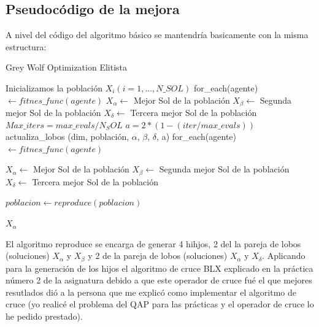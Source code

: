 \documentclass[a4paper, 12.5pt]{report}
\begin{document}
\subsection{Pseudocódigo de la mejora}

A nivel del código del algoritmo básico se mantendría basicamente con la misma estructura:

\begin{algorithm}[H]
    \caption{Grey Wolf Optimization Elitista}\label{alg:GWO_mejorado}
    \begin{algorithmic}[1]
        \State Inicializamos la población $X_i (i=1,...,N\_SOL)$
        \State for\_each(agente) $ \gets fitnes\_func(agente)$
        \State $X_\alpha \gets$ Mejor Sol de la población
        \State $X_\beta \gets$ Segunda mejor Sol de la población
        \State $X_\delta \gets$ Tercera mejor Sol de la población
        \State $Max\_iters=max\_evals/N_SOL$
        \State $a=2*(1-(iter/max\_evals))$
        \State actualiza\_lobos (dim, población, $\alpha$, $\beta$, $\delta$, a)
        \State for\_each(agente) $ \gets fitnes\_func(agente)$

        \State $X_\alpha \gets$ Mejor Sol de la población
        \State $X_\beta \gets$ Segunda mejor Sol de la población
        \State $X_\delta \gets$ Tercera mejor Sol de la población

        \State $poblacion \gets reproduce(poblacion)$ 


        \EndFor

        \Return $X_\alpha $
        \EndFunction


    \end{algorithmic}
\end{algorithm}


El algoritmo reproduce se encarga de generar 4 hihjos, 2 del la pareja de lobos (soluciones) $X_\alpha$ y $X_\beta$ y 2 de la pareja de lobos (soluciones) $X_\alpha$ y $X_\delta$. Aplicando para la generación de los hijos el algoritmo de cruce BLX explicado en la práctica número 2 de la asignatura debido a que este operador de cruce fué el que mejores resutlados dió a la persona que me explicó como implementar el algoritmo de cruce (yo realicé el problema del QAP para las prácticas y el operador de cruce lo he pedido prestado).
\end{document}
